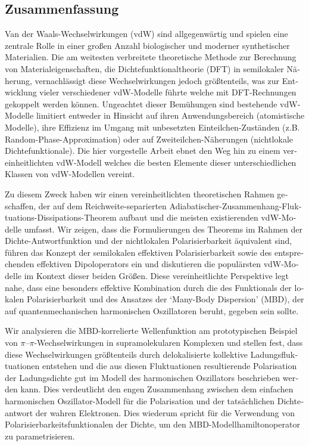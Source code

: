 
\begin{otherlanguage}{german}
\section*{Zusammenfassung}

Van der Waals-Wechselwirkungen (vdW) sind allgegenwärtig und spielen eine zentrale Rolle in einer großen Anzahl biologischer und moderner synthetischer Materialien.
Die am weitesten verbreitete theoretische Methode zur Berechnung von Materialeigenschaften, die Dichtefunktionaltheorie (DFT) in semilokaler Näherung, vernachlässigt diese Wechselwirkungen jedoch größtenteils, was zur Entwicklung vieler verschiedener vdW-Modelle führte welche mit DFT-Rechnungen gekoppelt werden können.
Ungeachtet dieser Bemühungen sind bestehende vdW-Modelle limitiert entweder in Hinsicht auf ihren Anwendungsbereich (atomistische Modelle), ihre Effizienz im Umgang mit unbesetzten Einteilchen-Zuständen (z.B.
Random-Phase-Approximation) oder auf Zweiteilchen-Näherungen (nichtlokale Dichtefunktionale).
Die hier vorgestelle Arbeit ebnet den Weg hin zu einem vereinheitlichten vdW-Modell welches die besten Elemente dieser unterschiedlichen Klassen von vdW-Modellen vereint.

Zu diesem Zweck haben wir einen vereinheitlichten theoretischen Rahmen geschaffen, der auf  dem Reichweite-separierten Adiabatischer-Zusammenhang-Fluktuations-Dissipations-Theorem aufbaut und die meisten existierenden vdW-Modelle umfasst.
Wir zeigen, dass die Formulierungen des Theorems im Rahmen der Dichte-Antwortfunktion und der nichtlokalen Polarisierbarkeit äquivalent sind, führen das Konzept der semilokalen effektiven Polarisierbarkeit sowie des entsprechenden effektiven Dipoloperators ein und diskutieren die populärsten vdW-Modelle im Kontext dieser beiden Größen.
Diese vereinheitlichte Perspektive legt nahe, dass eine besonders effektive Kombination durch die des Funktionals der lokalen Polarisierbarkeit und des Ansatzes der `Many-Body Dispersion' (MBD), der auf quantenmechanischen harmonischen Oszillatoren beruht, gegeben sein 
sollte.

Wir analysieren die MBD-korrelierte Wellenfunktion am prototypischen Beispiel von $\pi$--$\pi$-Wechselwirkungen in supramolekularen Komplexen und stellen fest, dass diese Wechselwirkungen größtenteils durch delokalisierte kollektive Ladungsfluktuationen entstehen und die aus diesen Fluktuationen resultierende Polarisation der Ladungsdichte gut im Modell des harmonischen Oszillators beschrieben werden kann.
Dies verdeutlicht den engen Zusammenhang zwischen dem einfachen harmonischen Oszillator-Modell für die Polarisation und der tatsächlichen Dichteantwort der wahren Elektronen.
Dies wiederum spricht für die Verwendung von Polarisierbarkeitsfunktionalen der Dichte, um den MBD-Modellhamiltonoperator zu parametrisieren.


\end{otherlanguage}
